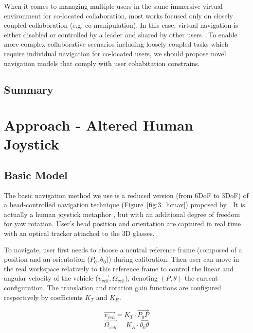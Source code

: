When it comes to managing multiple users in the same immersive virtual environment for co-located collaboration, most works focused only on closely coupled collaboration (e.g. co-manipulation). In this case, virtual navigation is either disabled or controlled by a leader and shared by other users \citep{Beck2013IGG, Kulik2011CSS}. To enable more complex collaborative scenarios including loosely coupled tasks which require individual navigation for co-located users, we should propose novel navigation models that comply with user cohabitation constrains.

\subsection{Summary}

\section{Approach - Altered Human Joystick}

\subsection{Basic Model}
The basic navigation method we use is a reduced version (from 6DoF to 3DoF) of a head-controlled navigation technique (Figure~\ref{fig:3_hcnav}) proposed by \citet{Bourdot2002HCNav}. It is actually a human joystick metaphor \citep{McMahan2012EDF}, but with an additional degree of freedom for yaw rotation. User's head position and orientation are captured in real time with an optical tracker attached to the 3D glasses.

To navigate, user first needs to choose a neutral reference frame (composed of a position and an orientation ($P_{0}, \theta_{0}$)) during calibration. Then user can move in the real workspace relatively to this reference frame to control the linear and angular velocity of the vehicle ($\overrightarrow{v_{veh}}, \Omega_{veh}$), denoting $(P, \theta)$ the current configuration. The translation and rotation gain functions are configured respectively by coefficients $K_{T}$ and $K_{R}$.

\begin{equation}
\overrightarrow{v_{veh}}=K_{T}\cdot \overrightarrow{P_{0}P}
\end{equation}
\begin{equation}
\overrightarrow{\Omega_{veh}}=K_{R}\cdot \widehat{\theta_{0}\theta}
\end{equation}

